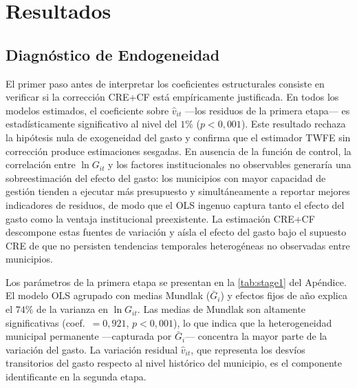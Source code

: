 
\section{Resultados}
\label{sec:resultados}

\subsection{Diagnóstico de Endogeneidad}
\label{sec:endogeneidad}

El primer paso antes de interpretar los coeficientes estructurales consiste en verificar si la corrección CRE+CF está empíricamente justificada. En todos los modelos estimados, el coeficiente sobre $\hat{v}_{it}$ ---los residuos de la primera etapa--- es estadísticamente significativo al nivel del $1\%$ ($p < 0{,}001$). Este resultado rechaza la hipótesis nula de exogeneidad del gasto y confirma que el estimador TWFE sin corrección produce estimaciones sesgadas. En ausencia de la función de control, la correlación entre $\ln G_{it}$ y los factores institucionales no observables generaría una sobreestimación del efecto del gasto: los municipios con mayor capacidad de gestión tienden a ejecutar más presupuesto y simultáneamente a reportar mejores indicadores de residuos, de modo que el OLS ingenuo captura tanto el efecto del gasto como la ventaja institucional preexistente. La estimación CRE+CF descompone estas fuentes de variación y aísla el efecto del gasto bajo el supuesto CRE de que no persisten tendencias temporales heterogéneas no observadas entre municipios.

Los parámetros de la primera etapa se presentan en la \cref{tab:stage1} del Apéndice. El modelo OLS agrupado con medias Mundlak ($\bar{G}_{i}$) y efectos fijos de año explica el $74\%$ de la varianza en $\ln G_{it}$. Las medias de Mundlak son altamente significativas (coef.\ $= 0{,}921$, $p < 0{,}001$), lo que indica que la heterogeneidad municipal permanente ---capturada por $\bar{G}_{i}$--- concentra la mayor parte de la variación del gasto. La variación residual $\hat{v}_{it}$, que representa los desvíos transitorios del gasto respecto al nivel histórico del municipio, es el componente identificante en la segunda etapa.

